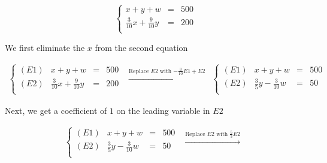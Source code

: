 \documentclass{ximera}
\begin{document}
\begin{example}
\[ \left\{ \begin{array}{rcl} x+y+w & = & 500 \\ 
\frac{3}{10}x + \frac{9}{10}y & = & 200 \\ \end{array} \right.\]  

We first eliminate the $x$ from the second equation 

\[\begin{array}{ccc}
\left\{ 

\begin{array}{lrcr}

(E1) & x+y+w & = & 500 \\  
(E2) & \frac{3}{10}x + \frac{9}{10}y & = & 200 \\    

\end{array} 

\right.

&

\xrightarrow{\text{Replace $E2$ with $-\frac{3}{10}E1 + E2$}}

&

\left\{ 

\begin{array}{lrcr}

(E1) & x+y+w & = & 500 \\  
(E2) &  \frac{3}{5}y - \frac{3}{10}w & = & 50 \\    

\end{array} 

\right.

\end{array}\]

Next, we get a coefficient of $1$ on the leading variable in $E2$

\[\begin{array}{ccc}


\left\{ 

\begin{array}{lrcr}

(E1) & x+y+w & = & 500 \\  
(E2) &  \frac{3}{5}y - \frac{3}{10}w & = & 50 \\    

\end{array} 

\right.

&

\xrightarrow{\text{Replace $E2$ with $\frac{5}{3}E2$}}

&



\end{array}\]
\end{example}
\end{document}
